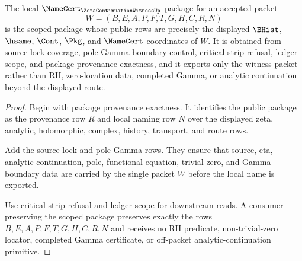 \begin{theorem}
\label{thm:zeta-continuation-witness-local-namecert-scoped-package}
The local $\NameCert_{\ZetaContinuationWitnessUp}$ package for an accepted packet
$$
W=(B,E,A,P,F,T,G,H,C,R,N)
$$
is the scoped package whose public rows are precisely the displayed $\BHist$, $\hsame$, $\Cont$, $\Pkg$, and $\NameCert$ coordinates of $W$. It is obtained from source-lock coverage, pole-Gamma boundary control, critical-strip refusal, ledger scope, and package provenance exactness, and it exports only the witness packet rather than RH, zero-location data, completed Gamma, or analytic continuation beyond the displayed route.
\end{theorem}
\begin{proof}
Begin with package provenance exactness. It identifies the public package as the provenance row $R$ and local naming row $N$ over the displayed zeta, analytic, holomorphic, complex, history, transport, and route rows.

Add the source-lock and pole-Gamma rows. They ensure that source, eta, analytic-continuation, pole, functional-equation, trivial-zero, and Gamma-boundary data are carried by the single packet $W$ before the local name is exported.

Use critical-strip refusal and ledger scope for downstream reads. A consumer preserving the scoped package preserves exactly the rows $B,E,A,P,F,T,G,H,C,R,N$ and receives no RH predicate, non-trivial-zero locator, completed Gamma certificate, or off-packet analytic-continuation primitive.
\end{proof}

